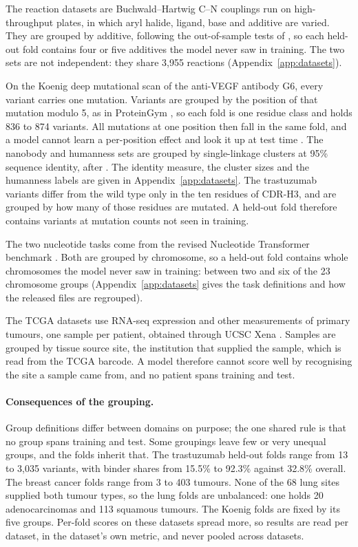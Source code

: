 The reaction datasets are Buchwald--Hartwig C--N couplings run on high-throughput plates, in which aryl halide, ligand, base and additive are varied. They are grouped by additive, following the out-of-sample tests of \citet{Ahneman2018}, so each held-out fold contains four or five additives the model never saw in training. The two sets are not independent: they share 3,955 reactions (Appendix~\ref{app:datasets}).

On the Koenig deep mutational scan of the anti-VEGF antibody G6, every variant carries one mutation. Variants are grouped by the position of that mutation modulo 5, as in ProteinGym \citep{Notin2023}, so each fold is one residue class and holds 836 to 874 variants. All mutations at one position then fall in the same fold, and a model cannot learn a per-position effect and look it up at test time \citep{Vieira2026}. The nanobody and humanness sets are grouped by single-linkage clusters at 95\% sequence identity, after \citet{Kenlay2024}. The identity measure, the cluster sizes and the humanness labels are given in Appendix~\ref{app:datasets}. The trastuzumab variants differ from the wild type only in the ten residues of CDR-H3, and are grouped by how many of those residues are mutated. A held-out fold therefore contains variants at mutation counts not seen in training.

The two nucleotide tasks come from the revised Nucleotide Transformer benchmark \citep{DallaTorre2025}. Both are grouped by chromosome, so a held-out fold contains whole chromosomes the model never saw in training: between two and six of the 23 chromosome groups (Appendix~\ref{app:datasets} gives the task definitions and how the released files are regrouped).

The TCGA datasets use RNA-seq expression and other measurements of primary tumours, one sample per patient, obtained through UCSC Xena \citep{Goldman2020}. Samples are grouped by tissue source site, the institution that supplied the sample, which is read from the TCGA barcode. A model therefore cannot score well by recognising the site a sample came from, and no patient spans training and test.

\paragraph{Consequences of the grouping.} Group definitions differ between domains on purpose; the one shared rule is that no group spans training and test. Some groupings leave few or very unequal groups, and the folds inherit that. The trastuzumab held-out folds range from 13 to 3,035 variants, with binder shares from 15.5\% to 92.3\% against 32.8\% overall. The breast cancer folds range from 3 to 403 tumours. None of the 68 lung sites supplied both tumour types, so the lung folds are unbalanced: one holds 20 adenocarcinomas and 113 squamous tumours. The Koenig folds are fixed by its five groups. Per-fold scores on these datasets spread more, so results are read per dataset, in the dataset's own metric, and never pooled across datasets.
